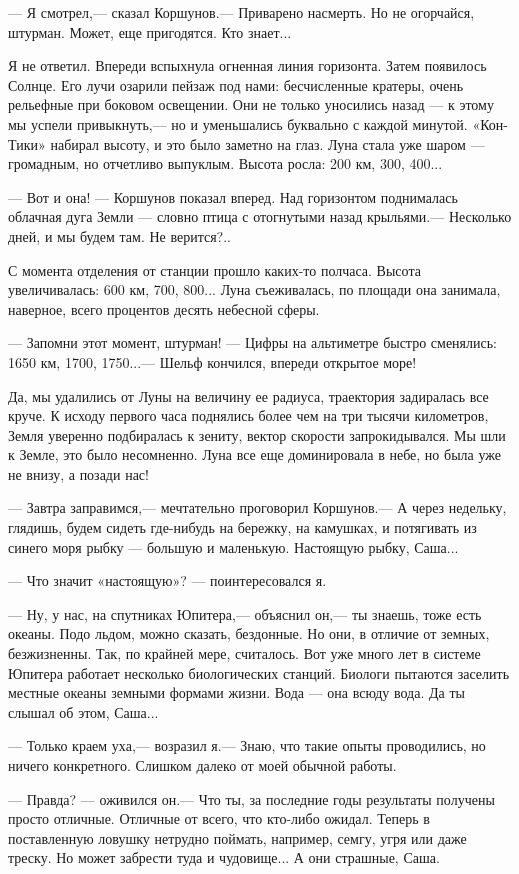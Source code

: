 \documentclass[11pt,a4paper,oneside]{article}
\begin{document}
— Я смотрел,— сказал Коршунов.— Приварено насмерть. Но не огорчайся, штурман. Может, еще пригодятся. Кто знает...

Я не ответил. Впереди вспыхнула огненная линия горизонта. Затем появилось Солнце. Его лучи озарили пейзаж под нами: бесчисленные кратеры, очень рельефные при боковом освещении. Они не только уносились назад — к этому мы успели привыкнуть,— но и уменьшались буквально с каждой минутой. «Кон-Тики» набирал высоту, и это было заметно на глаз. Луна стала уже шаром — громадным, но отчетливо выпуклым. Высота росла: 200 км, 300, 400...

— Вот и она! — Коршунов показал вперед. Над горизонтом поднималась облачная дуга Земли — словно птица с отогнутыми назад крыльями.— Несколько дней, и мы будем там. Не верится?..

С момента отделения от станции прошло каких-то полчаса. Высота увеличивалась: 600 км, 700, 800... Луна съеживалась, по площади она занимала, наверное, всего процентов десять небесной сферы.

— Запомни этот момент, штурман! — Цифры на альтиметре быстро сменялись: 1650 км, 1700, 1750...— Шельф кончился, впереди открытое море!

Да, мы удалились от Луны на величину ее радиуса, траектория задиралась все круче. К исходу первого часа поднялись более чем на три тысячи километров, Земля уверенно подбиралась к зениту, вектор скорости запрокидывался. Мы шли к Земле, это было несомненно. Луна все еще доминировала в небе, но была уже не внизу, а позади нас!

— Завтра заправимся,— мечтательно проговорил Коршунов.— А через недельку, глядишь, будем сидеть где-нибудь на бережку, на камушках, и потягивать из синего моря рыбку — большую и маленькую. Настоящую рыбку, Саша...

— Что значит «настоящую»? — поинтересовался я.

— Ну, у нас, на спутниках Юпитера,— объяснил он,— ты знаешь, тоже есть океаны. Подо льдом, можно сказать, бездонные. Но они, в отличие от земных, безжизненны. Так, по крайней мере, считалось. Вот уже много лет в системе Юпитера работает несколько биологических станций. Биологи пытаются заселить местные океаны земными формами жизни. Вода — она всюду вода. Да ты слышал об этом, Саша...

— Только краем уха,— возразил я.— Знаю, что такие опыты проводились, но ничего конкретного. Слишком далеко от моей обычной работы.

— Правда? — оживился он.— Что ты, за последние годы результаты получены просто отличные. Отличные от всего, что кто-либо ожидал. Теперь в поставленную ловушку нетрудно поймать, например, семгу, угря или даже треску. Но может забрести туда и чудовище... А они страшные, Саша.
\end{document}
